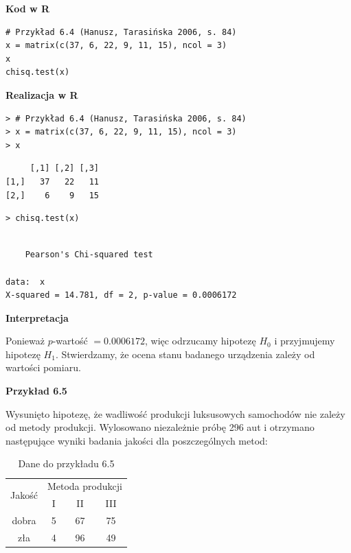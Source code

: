 \documentclass[12pt,B5paper,]{book}
\begin{document}
\vspace{0.8cm} \textbf{Kod w R}

\begin{verbatim}
# Przykład 6.4 (Hanusz, Tarasińska 2006, s. 84)
x = matrix(c(37, 6, 22, 9, 11, 15), ncol = 3)
x
chisq.test(x)
\end{verbatim}

\vspace{0.8cm} \textbf{Realizacja w R}

\begin{verbatim}
> # Przykład 6.4 (Hanusz, Tarasińska 2006, s. 84)
> x = matrix(c(37, 6, 22, 9, 11, 15), ncol = 3)
> x
\end{verbatim}

\begin{verbatim}
     [,1] [,2] [,3]
[1,]   37   22   11
[2,]    6    9   15
\end{verbatim}

\begin{verbatim}
> chisq.test(x)
\end{verbatim}

\begin{verbatim}

    Pearson's Chi-squared test

data:  x
X-squared = 14.781, df = 2, p-value = 0.0006172
\end{verbatim}

\vspace{0.8cm} \textbf{Interpretacja}

Ponieważ \(p\)-wartość \(= 0.0006172\), więc odrzucamy hipotezę \(H_0\)
i przyjmujemy hipotezę \(H_1\). Stwierdzamy, że ocena stanu badanego
urządzenia zależy od wartości pomiaru.

\vspace{0.8cm} \textbf{Przykład 6.5}

Wysunięto hipotezę, że wadliwość produkcji luksusowych samochodów nie
zależy od metody produkcji. Wylosowano niezależnie próbę 296 aut i
otrzymano następujące wyniki badania jakości dla poszczególnych metod:

\begin{table}[H]
\centering
\caption{Dane do przykładu 6.5}
\label{dane6.4}
\begin{tabular}{cccc}
\hline
\multirow{2}{*}{Jakość} &  \multicolumn{3}{c}{Metoda produkcji} \\
 & I     & II    & III    \\ \hline
dobra        & 5 & 67  & 75 \\
zła         & 4  & 96  & 49   \\ \hline    
\end{tabular}
\end{table}
\end{document}
